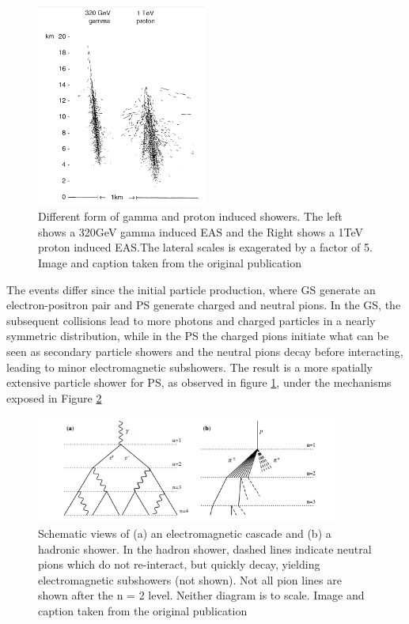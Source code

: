 \documentclass{article}
\begin{document}
 \begin{figure}[!h]
    \centering
    \includegraphics[width=0.5\textwidth]{imgs/showersdif.PNG}
    \caption{Different form of gamma and proton induced showers. The left shows a 320GeV gamma induced EAS and the Right shows a 1TeV proton induced EAS.The lateral scales is exagerated by a factor of 5. Image and caption taken from the original publication \cite{differencesgp}}
    \label{fig:difergp}
\end{figure}
The events differ since the initial particle production, where GS generate an electron-positron pair and PS generate charged and neutral pions. In the GS, the subsequent collisions lead to more photons and charged particles in a nearly symmetric distribution, while in the PS the charged pions initiate what can be seen as secondary particle showers and the neutral pions decay before interacting, leading to minor electromagnetic subshowers. The result is a more spatially extensive particle shower for PS, as observed in figure \ref{fig:difergp}, under the mechanisms exposed in Figure \ref{fig:difergp_heitler}

 \begin{figure}[!h]
    \centering
    \includegraphics[width=0.9\textwidth]{imgs/showersdif_heit.PNG}
    \caption{Schematic views of (a) an electromagnetic cascade and (b) a hadronic shower. In the hadron shower, dashed lines indicate
neutral pions which do not re-interact, but quickly decay, yielding electromagnetic subshowers (not shown). Not all pion lines are
shown after the n = 2 level. Neither diagram is to scale. Image and caption taken from the original publication \cite{heitlerarticle}}
    \label{fig:difergp_heitler}
\end{figure}
\end{document}
